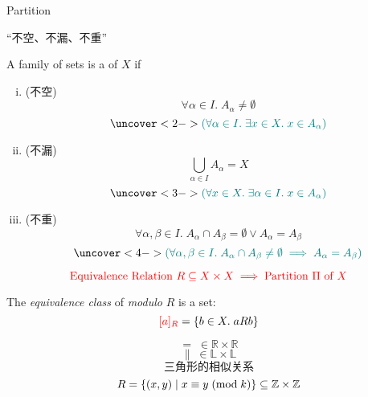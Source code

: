 \begin{frame}{}
  \centerline{\LARGE Partition}

  \vspace{0.60cm}

  \begin{center}
    ``不空、不漏、不重''
  \end{center}
\end{frame}

\begin{frame}{}
  \begin{definition}[划分 (Partition)]
    A family of sets 
    is a  of $X$ if

    \begin{enumerate}[(i)]
      \item (不空)
        \[
          \forall \alpha \in I.\; A_{\alpha} \neq \emptyset
        \]
        \[
          \uncover<2->{\teal{(\forall \alpha \in I.\; \exists x \in X.\; x \in A_{\alpha})}}
        \]
      \item (不漏)
        \[
          \bigcup_{\alpha \in I} A_{\alpha} = X
        \]
        \[
          \uncover<3->{\teal{(\forall x \in X.\; \exists \alpha \in I.\; x \in A_{\alpha})}}
        \]
      \item (不重)
        \[
          \forall \alpha, \beta \in I.\; A_{\alpha} \cap A_{\beta} = \emptyset \lor A_{\alpha} = A_{\beta}
        \]
        \[
          \uncover<4->{\teal{(\forall \alpha, \beta \in I.\; A_{\alpha} \cap A_{\beta} \neq \emptyset \implies A_{\alpha} = A_{\beta})}}
        \]
    \end{enumerate}
  \end{definition}
\end{frame}

\begin{frame}{}
  \[
    \textcolor{red}{\text{Equivalence Relation } R \subseteq X \times X \implies \text{Partition } \Pi \text{ of } X}
  \]

  \pause
  \begin{definition}
    The {\it equivalence class} of  {\it modulo} $R$ is a set:
    \[
      \textcolor{red}{[a]_{R}} = \{b \in X.\; a R b\}
    \]
  \end{definition}
  \pause
  \[
    =\; \in \mathbb{R} \times \mathbb{R}
  \]
  \pause
  \[
    \parallel\; \in \mathbb{L} \times \mathbb{L}
  \]
  \pause
  \[
    \text{三角形的相似关系}
  \]
  \pause
  \[
    R = \{(x, y) \mid x \equiv y \;(\text{mod}\; k)\}
      \subseteq \mathbb{Z} \times \mathbb{Z}
  \]
\end{frame}

